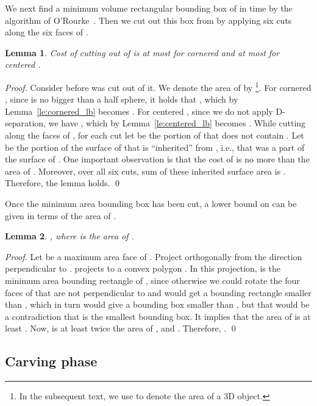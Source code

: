 \documentclass{llncs}
\newtheorem{lem}{Lemma}
\begin{document}
We next find a minimum volume rectangular bounding box  of  in  time 
by the algorithm of O'Rourke~\cite{O85}.
Then we cut out this box from  by applying six cuts along the six faces of .

\begin{lem}
\label{le:garbage1}
Cost of cutting  out of  is at most  for cornered  and at most  for centered .
\end{lem}

\begin{proof}
Consider  before  was cut out of it.
We denote the area of  by \footnote{In the subsequent text, we use  to denote the area of a 3D object.}.
For cornered , since  is no bigger than a half sphere, it holds that ,
which by Lemma~\ref{le:cornered_lb} becomes . 
For centered , since we do not apply D-separation, we have ,
which by Lemma~\ref{le:centered_lb} becomes .
While cutting along the faces of , for each cut  let  be the portion of 
that does not contain . 
Let  be the portion of the surface of  that is ``inherited'' from , 
i.e., that was a part of the surface of .
One important observation is that the cost of  is no more than the area of .
Moreover, over all six cuts, sum of these inherited surface area is .
Therefore, the lemma holds.
\qed
\end{proof}

Once the minimum area bounding box  has been cut, a lower bound on  can be 
given in terms of the area of .


\begin{lem}
\label{le:lb}
, where  is the area of .
\end{lem}

\begin{proof}
Let  be a maximum area face of .
Project  orthogonally from the direction perpendicular to .
 projects to a convex polygon .
In this projection,  is the minimum area bounding rectangle of ,
since otherwise we could rotate the four faces of  that are not perpendicular to 
and would get a bounding rectangle smaller than , which in turn would give a bounding box smaller than ,
but that would be a contradiction that  is the smallest bounding box.
It implies that the area of  is at least .
Now,  is at least twice the area of , and . 
Therefore, .
\qed
\end{proof}

\subsection{Carving phase} 
\end{document}
